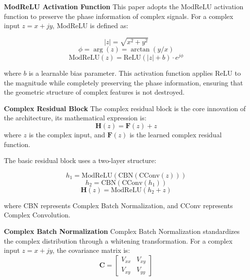\documentclass[conference]{IEEEtran}
\begin{document}
\textbf{ModReLU Activation Function} This paper adopts the ModReLU activation function to preserve the phase information of complex signals. For a complex input $z = x + jy$, ModReLU is defined as:

\begin{equation}
|z| = \sqrt{x^2 + y^2}
\end{equation}
\begin{equation}
\phi = \arg(z) = \arctan(y/x)
\end{equation}
\begin{equation}
\text{ModReLU}(z) = \text{ReLU}(|z| + b) \cdot e^{j\phi}
\end{equation}

where $b$ is a learnable bias parameter. This activation function applies ReLU to the magnitude while completely preserving the phase information, ensuring that the geometric structure of complex features is not destroyed.

\textbf{Complex Residual Block} The complex residual block is the core innovation of the architecture, its mathematical expression is:
\begin{equation}
\mathbf{H}(z) = \mathbf{F}(z) + z
\end{equation}
where $z$ is the complex input, and $\mathbf{F}(z)$ is the learned complex residual function.

The basic residual block uses a two-layer structure:

\begin{equation}
h_1 = \text{ModReLU}(\text{CBN}(\text{CConv}(z)))
\end{equation}
\begin{equation}
h_2 = \text{CBN}(\text{CConv}(h_1))
\end{equation}
\begin{equation}
\mathbf{H}(z) = \text{ModReLU}(h_2 + z)
\end{equation}

where CBN represents Complex Batch Normalization, and CConv represents Complex Convolution.

\textbf{Complex Batch Normalization} Complex Batch Normalization standardizes the complex distribution through a whitening transformation. For a complex input $z = x + jy$, the covariance matrix is:
\begin{equation}
\mathbf{C} = \begin{bmatrix} V_{xx} & V_{xy} \\ V_{xy} & V_{yy} \end{bmatrix}
\end{equation}
\end{document}

